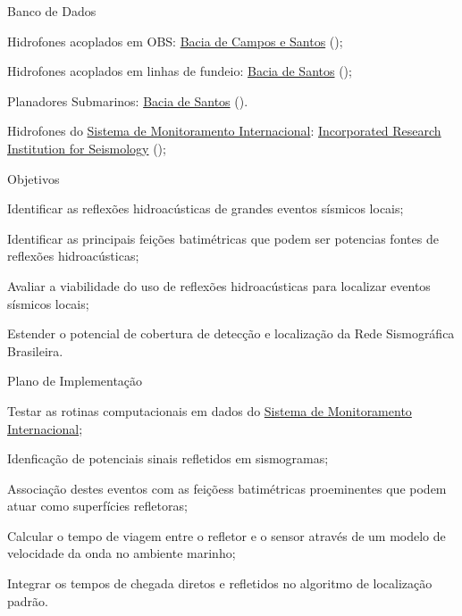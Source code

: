 \documentclass[10pt,a4paper,oneside]{book}
\begin{document}
\begin{fancyenum}{\faDatabase}{Banco de Dados}
	\item Hidrofones acoplados em OBS: \href{https://sismo-oceano.ufsc.br/}{Bacia de Campos e Santos} (\faLock);
	\item Hidrofones acoplados em linhas de fundeio: \href{https://comunicabaciadesantos.petrobras.com.br/projeto-de-monitoramento-da-paisagem-acustica-submarina-pmpas-}{Bacia de Santos} (\faLock);
	\item Planadores Submarinos: \href{https://comunicabaciadesantos.petrobras.com.br/projeto-de-monitoramento-da-paisagem-acustica-submarina-pmpas-}{Bacia de Santos} (\faLock).
	\item Hidrofones do \href{https://www.ctbto.org/our-work/international-monitoring-system}{Sistema de Monitoramento Internacional}: \href{https://ds.iris.edu/gmap/\#network=IM\&planet=earth}{Incorporated Research Institution for Seismology} (\faUnlock);
\end{fancyenum}

\begin{fancyenum}{\faFutbol}{Objetivos}
	\item Identificar as reflexões hidroacústicas de grandes eventos sísmicos locais;
	\item Identificar as principais feições batimétricas que podem ser potencias fontes de reflexões hidroacústicas;
	\item Avaliar a viabilidade do uso de reflexões hidroacústicas para localizar eventos sísmicos locais;
	\item Estender o potencial de cobertura de detecção e localização da Rede Sismográfica Brasileira.
\end{fancyenum}

\begin{fancyenum}{\faBrain}{Plano de Implementação}
	\item Testar as rotinas computacionais em dados do \href{https://www.ctbto.org/our-work/international-monitoring-system}{Sistema de Monitoramento Internacional};
	\item Idenficação de potenciais sinais refletidos em sismogramas;
	\item Associação destes eventos com as feiçõess batimétricas proeminentes que podem atuar como superfícies refletoras;
	\item Calcular o tempo de viagem entre o refletor e o sensor através de um modelo de velocidade da onda no ambiente marinho;
	\item Integrar os tempos de chegada diretos e refletidos no algoritmo de localização padrão.
\end{fancyenum}
\end{document}
